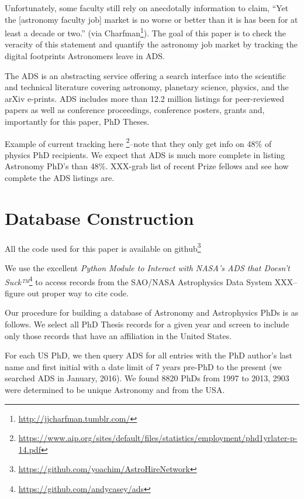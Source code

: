 \documentclass[preprint2]{aastex}
\begin{document}
Unfortunately, some faculty still rely on anecdotally information to claim, ``Yet the [astronomy faculty job] market is no worse or better than it is has been for at least a decade or two.'' (via Charfman\footnote{\url{http://jjcharfman.tumblr.com/}}).  The goal of this paper is to check the veracity of this statement and quantify the astronomy job market by tracking the digital footprints Astronomers leave in ADS. 

The ADS is an abstracting service offering a search interface into the scientific and technical literature covering astronomy, planetary science, physics, and the arXiv e-prints.  ADS includes more than 12.2 million listings for peer-reviewed papers as well as conference proceedings, conference posters, grants and, importantly for this paper, PhD Theses.  

Example of current tracking here \footnote{\url{https://www.aip.org/sites/default/files/statistics/employment/phd1yrlater-p-14.pdf}}--note that they only get info on 48\% of physics PhD recipients.  We expect that ADS is much more complete in listing Astronomy PhD's than 48\%. XXX-grab list of recent Prize fellows and see how complete the ADS listings are.



\section{Database Construction}\label{sec:db_construct}

All the code used for this paper is available on github\footnote{\url{https://github.com/yoachim/AstroHireNetwork}}

We use the excellent {\emph{Python Module to Interact with NASA's ADS that Doesn't Suck™}}\footnote{\url{https://github.com/andycasey/ads}} to access records from the SAO/NASA Astrophysics Data System XXX--figure out proper way to cite code. 

Our procedure for building a database of Astronomy and Astrophysics PhDs is as follows.  We select all PhD Thesis records for a given year and screen to include only those records that have an affiliation in the United States.

For each US PhD, we then query ADS for all entries with the PhD author's last name and first initial with a date limit of 7 years pre-PhD to the present (we searched ADS in January, 2016). We found 8820 PhDs from 1997 to 2013, 2903 were determined to be unique Astronomy and from the USA.
\end{document}
